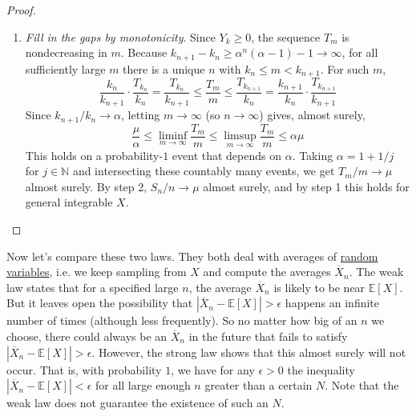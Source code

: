 \begin{proof}
\begin{enumerate}
			 \item \textit{Fill in the gaps by monotonicity}. Since $Y_k \geq 0$, the sequence $T_m$ is nondecreasing in $m$. Because $k_{n+1} - k_n \geq \alpha^n(\alpha - 1) - 1 \to \infty$, for all sufficiently large $m$ there is a unique $n$ with $k_n \leq m < k_{n+1}$. For such $m$,
			 \begin{equation}
				 \frac{k_n}{k_{n+1}} \cdot \frac{T_{k_n}}{k_n} = \frac{T_{k_n}}{k_{n+1}} \leq \frac{T_m}{m} \leq \frac{T_{k_{n+1}}}{k_n} = \frac{k_{n+1}}{k_n} \cdot \frac{T_{k_{n+1}}}{k_{n+1}}
			 \end{equation}
			 Since $k_{n+1}/k_n \to \alpha$, letting $m \to \infty$ (so $n \to \infty$) gives, almost surely,
			 \begin{equation}
				 \frac{\mu}{\alpha} \leq \liminf_{m \to \infty} \frac{T_m}{m} \leq \limsup_{m \to \infty} \frac{T_m}{m} \leq \alpha \mu
			 \end{equation}
			 This holds on a probability-$1$ event that depends on $\alpha$. Taking $\alpha = 1 + 1/j$ for $j \in \mathbb{N}$ and intersecting these countably many events, we get $T_m / m \to \mu$ almost surely. By step 2, $S_n / n \to \mu$ almost surely, and by step 1 this holds for general integrable $X$.
			\end{enumerate}
	\end{proof}

  Now let's compare these two laws. They both deal with averages of \hyperref[def:random-variable]{random variables}, i.e. we keep sampling from $X$ and compute the averages $\overline{X}_n$. The weak law states that for a specified large $n$, the average $\overline{X}_n$ is likely to be near $\mathbb{E}[X]$. But it leaves open the possibility that $|\overline{X}_n - \mathbb{E}[X]| > \epsilon$ happens an infinite number of times (although less frequently). So no matter how big of an $n$ we choose, there could always be an $\overline{X}_n$ in the future that fails to satisfy $|\overline{X}_n - \mathbb{E}[X]| > \epsilon$. However, the strong law shows that this almost surely will not occur. That is, with probability $1$, we have for any $\epsilon > 0$ the inequality $|\overline{X}_n - \mathbb{E}[X]| < \epsilon$ for all large enough $n$ greater than a certain $N$. Note that the weak law does not guarantee the existence of such an $N$. 

